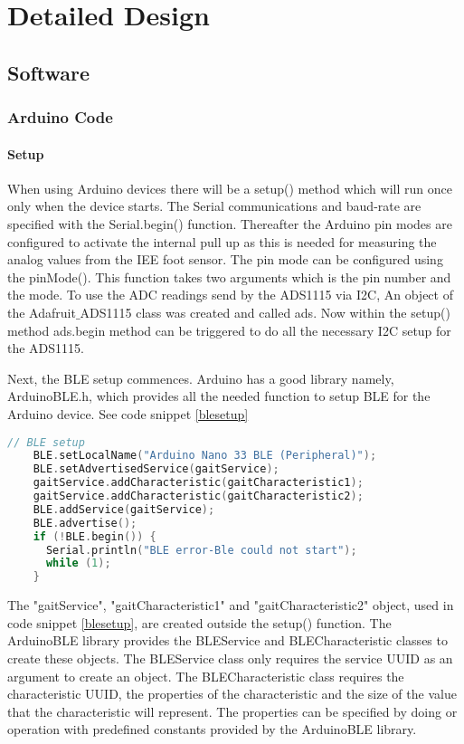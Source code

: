 \chapter{Detailed Design}
\label{chap:systemdesign}

\section{Software}
\subsection{Arduino Code}
\subsubsection{Setup}

When using Arduino devices there will be a setup() method which will run once only when the device starts. The Serial communications and baud-rate are specified with the Serial.begin() function. Thereafter the Arduino pin modes are configured to activate the internal pull up as this is needed for measuring the analog values from the IEE foot sensor. The pin mode can be configured using the pinMode(). This function takes two arguments which is the pin number and the mode. To use the ADC readings send by the ADS1115 via I2C, An object of the Adafruit$\_$ADS1115  class was created and called ads. Now within the setup() method ads.begin method can be triggered to do all the necessary I2C setup for the ADS1115.

Next, the BLE setup commences. Arduino has a good library namely, ArduinoBLE.h, which provides all the needed function to setup BLE for the Arduino device. See code snippet \ref{blesetup}
\begin{lstlisting}[language=c++, caption=BLE Setup, label=blesetup]
    // BLE setup
    BLE.setLocalName("Arduino Nano 33 BLE (Peripheral)");
    BLE.setAdvertisedService(gaitService);
    gaitService.addCharacteristic(gaitCharacteristic1);
    gaitService.addCharacteristic(gaitCharacteristic2);
    BLE.addService(gaitService);
    BLE.advertise();
    if (!BLE.begin()) {
      Serial.println("BLE error-Ble could not start");
      while (1);
    }
\end{lstlisting}



The "gaitService", "gaitCharacteristic1" and  "gaitCharacteristic2" object, used in code snippet \ref{blesetup}, are created outside the setup() function. The ArduinoBLE library provides the BLEService and BLECharacteristic classes to create these objects. The BLEService class only requires the service UUID as an argument to create an object. The BLECharacteristic class requires the characteristic UUID, the properties of the characteristic and the size of the value that the characteristic will represent. The properties can be specified by doing or operation with predefined constants provided by the ArduinoBLE library.

